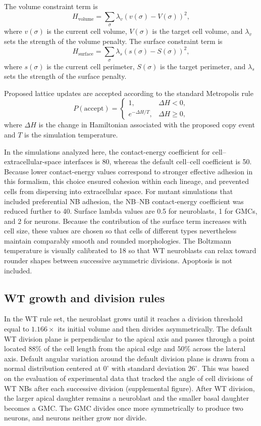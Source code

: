 The volume constraint term is
\[
H_{\mathrm{volume}} = \sum_{\sigma} \lambda_v \left(v(\sigma)-V(\sigma)\right)^2,
\]
where \(v(\sigma)\) is the current cell volume, \(V(\sigma)\) is the target cell volume, and \(\lambda_v\) sets the strength of the volume penalty.
The surface constraint term is
\[
H_{\mathrm{surface}} = \sum_{\sigma} \lambda_s \left(s(\sigma)-S(\sigma)\right)^2,
\]
where \(s(\sigma)\) is the current cell perimeter, \(S(\sigma)\) is the target perimeter, and \(\lambda_s\) sets the strength of the surface penalty.

Proposed lattice updates are accepted according to the standard Metropolis rule
\[
P(\mathrm{accept}) =
\begin{cases}
1, & \Delta H < 0, \\
e^{-\Delta H/T}, & \Delta H \geq 0,
\end{cases}
\]
where \(\Delta H\) is the change in Hamiltonian associated with the proposed copy event and \(T\) is the simulation temperature.

In the simulations analyzed here, the contact-energy coefficient for cell--extracellular-space interfaces is 80, whereas the default cell--cell coefficient is 50.
Because lower contact-energy values correspond to stronger effective adhesion in this formalism, this choice ensured cohesion within each lineage, and prevented cells from dispersing into extracellular space.
For mutant simulations that included preferential NB adhesion, the NB--NB contact-energy coefficient was reduced further to 40.
Surface lambda values are 0.5 for neuroblasts, 1 for GMCs, and 2 for neurons.
Because the contribution of the surface term increases with cell size, these values are chosen so that cells of different types nevertheless maintain comparably smooth and rounded morphologies.
The Boltzmann temperature is visually calibrated to 18 so that WT neuroblasts can relax toward rounder shapes between successive asymmetric divisions.
Apoptosis is not included.

\subsection{WT growth and division rules}

In the WT rule set, the neuroblast grows until it reaches a division threshold equal to $1.166\times$ its initial volume and then divides asymmetrically.
The default WT division plane is perpendicular to the apical axis and passes through a point located \(88\%\) of the cell length from the apical edge and \(50\%\) across the lateral axis.
Default angular variation around the default division plane is drawn from a normal distribution centered at \(0^\circ\) with standard deviation \(26^\circ\).
This was based on the evaluation of experimental data that tracked the angle of cell divisions of WT NBs after each successive division (supplemental figure).
After WT division, the larger apical daughter remains a neuroblast and the smaller basal daughter becomes a GMC.
The GMC divides once more symmetrically to produce two neurons, and neurons neither grow nor divide.

